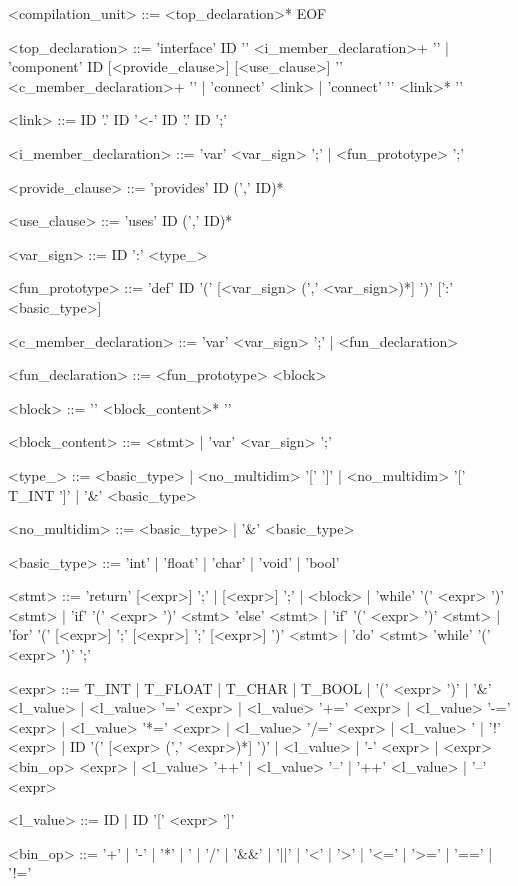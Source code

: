 <compilation_unit> ::= <top_declaration>* EOF

<top_declaration> ::= 'interface' ID '{' <i_member_declaration>+ '}'
                    | 'component' ID [<provide_clause>] [<use_clause>] '{'
                      <c_member_declaration>+ '}'
                    | 'connect' <link>
                    | 'connect' '{' <link>* '}'

<link> ::= ID '.' ID '<-' ID '.' ID ';'

<i_member_declaration> ::= 'var' <var_sign> ';'
                         | <fun_prototype> ';'

<provide_clause> ::= 'provides' ID (',' ID)*

<use_clause> ::= 'uses' ID (',' ID)*

<var_sign> ::= ID ':' <type_>

<fun_prototype> ::= 'def' ID '(' [<var_sign> (',' <var_sign>)*] ')' [':'
                    <basic_type>]

<c_member_declaration> ::= 'var' <var_sign> ';'
                         | <fun_declaration>

<fun_declaration> ::= <fun_prototype> <block>

<block> ::= '{' <block_content>* '}'

<block_content> ::= <stmt>
                  | 'var' <var_sign> ';'

<type_> ::= <basic_type>
          | <no_multidim> '[' ']'
          | <no_multidim> '[' T_INT ']'
          | '&' <basic_type>

<no_multidim> ::= <basic_type>
                | '&' <basic_type>

<basic_type> ::= 'int'
               | 'float'
               | 'char'
               | 'void'
               | 'bool'

<stmt> ::= 'return' [<expr>] ';'
         | [<expr>] ';'
         | <block>
         | 'while' '(' <expr> ')' <stmt>
         | 'if' '(' <expr> ')' <stmt> 'else' <stmt>
         | 'if' '(' <expr> ')' <stmt>
         | 'for' '(' [<expr>] ';' [<expr>] ';' [<expr>] ')' <stmt>
         | 'do' <stmt> 'while' '(' <expr> ')' ';'

<expr> ::= T_INT
         | T_FLOAT
         | T_CHAR
         | T_BOOL
         | '(' <expr> ')'
         | '&' <l_value>
         | <l_value> '=' <expr>
         | <l_value> '+=' <expr>
         | <l_value> '-=' <expr>
         | <l_value> '*=' <expr>
         | <l_value> '/=' <expr>
         | <l_value> '%
         | '!' <expr>
         | ID '(' [<expr> (',' <expr>)*] ')'
         | <l_value>
         | '-' <expr>
         | <expr> <bin_op> <expr>
         | <l_value> '++'
         | <l_value> '--'
         | '++' <l_value>
         | '--' <expr>

<l_value> ::= ID
            | ID '[' <expr> ']'

<bin_op> ::= '+'
           | '-'
           | '*'
           | '%
           | '/'
           | '&&'
           | '||'
           | '<'
           | '>'
           | '<='
           | '>='
           | '=='
           | '!='


